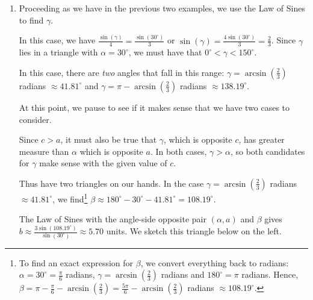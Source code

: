 \documentclass{ximera}
\begin{document}
\begin{example}
\begin{explanation}
\begin{enumerate}
\begin{image}
\end{image}

\item  Proceeding as we have in the previous two examples, we use the Law of Sines to find $\gamma$. 

 

 In this case, we have $\frac{\sin(\gamma)}{4} = \frac{\sin\left(30^{\circ}\right)}{3}$ or $\sin(\gamma) = \frac{4\sin\left(30^{\circ}\right)}{3} = \frac{2}{3}$.  Since $\gamma$ lies in a triangle with $\alpha = 30^{\circ}$, we must have that $0^{\circ} < \gamma < 150^{\circ}$.   
 
  
 
 In this case, there are \textit{two} angles that fall in this range:  $\gamma = \arcsin\left(\frac{2}{3}\right)$ radians $\approx 41.81^{\circ}$ and $\gamma = \pi - \arcsin\left(\frac{2}{3}\right)$ radians $\approx 138.19^{\circ}$. 
 
  
 
 At this point, we pause to see if it makes sense that we have two cases to consider.    
  
 
Since $c > a$, it must also be true that $\gamma$, which is opposite $c$, has greater measure than $\alpha$ which is opposite $a$.   In both cases, $\gamma > \alpha$, so both candidates for $\gamma$ make sense with the given value of $c$. 
 
  
 
 Thus have two triangles on our hands.  In the case $\gamma = \arcsin\left(\frac{2}{3}\right)$ radians $\approx 41.81^{\circ}$, we find\footnote{To find an exact expression for $\beta$, we convert everything back to radians:  $\alpha = 30^{\circ} = \frac{\pi}{6}$ radians, $\gamma = \arcsin\left(\frac{2}{3}\right)$ radians and $180^{\circ} = \pi$ radians.  Hence, $\beta = \pi - \frac{\pi}{6} - \arcsin\left(\frac{2}{3}\right) = \frac{5\pi}{6} - \arcsin\left(\frac{2}{3}\right)$ radians $\approx 108.19^{\circ}$.} $\beta \approx 180^{\circ} - 30^{\circ} - 41.81^{\circ}  = 108.19^{\circ}$.  
 
  
 
 The Law of Sines with the angle-side opposite pair $(\alpha, a)$ and $\beta$ gives $b \approx \frac{3 \sin\left(108.19^{\circ}\right)}{\sin\left(30^{\circ}\right)} \approx 5.70$ units.  We sketch this triangle below on the left.
 

\end{enumerate}
\end{explanation}
\end{example}
\end{document}
